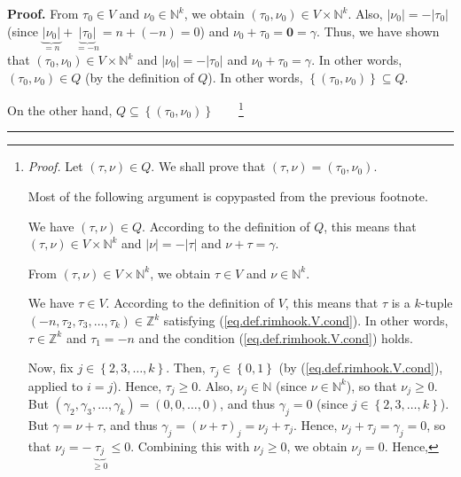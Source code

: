 \documentclass[numbers=enddot,12pt,final,onecolumn,notitlepage]{scrartcl}%
\theoremstyle{definition}
\newenvironment{proof}[1][Proof]{\noindent\textbf{#1.} }{\ \rule{0.5em}{0.5em}}
\begin{document}
\begin{proof}
From $\tau_{0}\in V$ and $\nu_{0}\in\mathbb{N}^{k}$, we obtain $\left(
\tau_{0},\nu_{0}\right)  \in V\times\mathbb{N}^{k}$. Also, $\left\vert \nu
_{0}\right\vert =-\left\vert \tau_{0}\right\vert $ (since
$\underbrace{\left\vert \nu_{0}\right\vert }_{=n}+\underbrace{\left\vert
\tau_{0}\right\vert }_{=-n}=n+\left(  -n\right)  =0$) and $\nu_{0}+\tau
_{0}=\mathbf{0}=\gamma$. Thus, we have shown that $\left(  \tau_{0},\nu
_{0}\right)  \in V\times\mathbb{N}^{k}$ and $\left\vert \nu_{0}\right\vert
=-\left\vert \tau_{0}\right\vert $ and $\nu_{0}+\tau_{0}=\gamma$. In other
words, $\left(  \tau_{0},\nu_{0}\right)  \in Q$ (by the definition of $Q$). In
other words, $\left\{  \left(  \tau_{0},\nu_{0}\right)  \right\}  \subseteq Q$.

On the other hand, $Q\subseteq\left\{  \left(  \tau_{0},\nu_{0}\right)
\right\}  $\ \ \ \ \footnote{\textit{Proof.} Let $\left(  \tau,\nu\right)  \in
Q$. We shall prove that $\left(  \tau,\nu\right)  =\left(  \tau_{0},\nu
_{0}\right)  $.
\par
Most of the following argument is copypasted from the previous footnote.
\par
We have $\left(  \tau,\nu\right)  \in Q$. According to the definition of $Q$,
this means that $\left(  \tau,\nu\right)  \in V\times\mathbb{N}^{k}$ and
$\left\vert \nu\right\vert =-\left\vert \tau\right\vert $ and $\nu+\tau
=\gamma$.
\par
From $\left(  \tau,\nu\right)  \in V\times\mathbb{N}^{k}$, we obtain $\tau\in
V$ and $\nu\in\mathbb{N}^{k}$.
\par
We have $\tau\in V$. According to the definition of $V$, this means that
$\tau$ is a $k$-tuple $\left(  -n,\tau_{2},\tau_{3},\ldots,\tau_{k}\right)
\in\mathbb{Z}^{k}$ satisfying (\ref{eq.def.rimhook.V.cond}). In other words,
$\tau\in\mathbb{Z}^{k}$ and $\tau_{1}=-n$ and the condition
(\ref{eq.def.rimhook.V.cond}) holds.
\par
Now, fix $j\in\left\{  2,3,\ldots,k\right\}  $. Then, $\tau_{j}\in\left\{
0,1\right\}  $ (by (\ref{eq.def.rimhook.V.cond}), applied to $i=j$). Hence,
$\tau_{j}\geq0$. Also, $\nu_{j}\in\mathbb{N}$ (since $\nu\in\mathbb{N}^{k}$),
so that $\nu_{j}\geq0$. But $\left(  \gamma_{2},\gamma_{3},\ldots,\gamma
_{k}\right)  =\left(  0,0,\ldots,0\right)  $, and thus $\gamma_{j}=0$ (since
$j\in\left\{  2,3,\ldots,k\right\}  $). But $\gamma=\nu+\tau$, and thus
$\gamma_{j}=\left(  \nu+\tau\right)  _{j}=\nu_{j}+\tau_{j}$. Hence, $\nu
_{j}+\tau_{j}=\gamma_{j}=0$, so that $\nu_{j}=-\underbrace{\tau_{j}}_{\geq
0}\leq0$. Combining this with $\nu_{j}\geq0$, we obtain $\nu_{j}=0$. Hence,
}
\end{proof}
\end{document}
